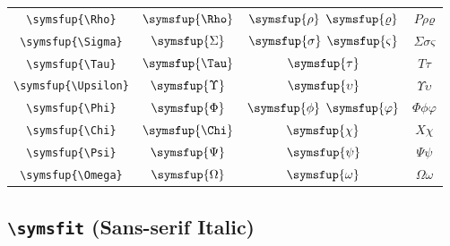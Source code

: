 \documentclass[12pt,a4paper]{article}
\begin{document}
\begin{longtable}{|c|c|c|c|}
\verb|\symsfup{\Rho}| & $\symsfup{\Rho}$ & $\symsfup{\rho}$ $\symsfup{\varrho}$ & $ Ρ 𝜌 𝜚 $ \\
\verb|\symsfup{\Sigma}| & $\symsfup{\Sigma}$ & $\symsfup{\sigma}$ $\symsfup{\varsigma}$ & $ Σ 𝜎 𝜍 $ \\
\verb|\symsfup{\Tau}| & $\symsfup{\Tau}$ & $\symsfup{\tau}$ & $ Τ 𝜏 $ \\
\verb|\symsfup{\Upsilon}| & $\symsfup{\Upsilon}$ & $\symsfup{\upsilon}$ & $ Υ 𝜐 $ \\
\verb|\symsfup{\Phi}| & $\symsfup{\Phi}$ & $\symsfup{\phi}$ $\symsfup{\varphi}$ & $ Φ 𝜙 𝜑 $ \\
\verb|\symsfup{\Chi}| & $\symsfup{\Chi}$ & $\symsfup{\chi}$ & $ Χ 𝜒 $ \\
\verb|\symsfup{\Psi}| & $\symsfup{\Psi}$ & $\symsfup{\psi}$ & $ Ψ 𝜓 $ \\
\verb|\symsfup{\Omega}| & $\symsfup{\Omega}$ & $\symsfup{\omega}$ & $ Ω 𝜔 $ \\
\hline
\end{longtable}

\newpage

\subsection*{\texttt{\textbackslash{}symsfit} (Sans-serif Italic)}
\end{document}
